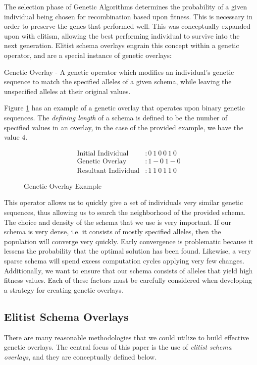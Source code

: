 The selection phase of Genetic Algorithms determines the probability of a given individual being chosen for recombination based upon fitness. This is necessary in order to preserve the genes that performed well. This was conceptually expanded upon with elitism, allowing the best performing individual to survive into the next generation. Elitist schema overlays engrain this concept within a genetic operator, and are a special instance of genetic overlays:

\begin{overlay}
Genetic Overlay - A genetic operator which modifies an individual's genetic sequence to match the specified alleles of a given schema, while leaving the unspecified alleles at their original values. 
\end{overlay}

Figure \ref{GO-Fig} has an example of a genetic overlay that operates upon binary genetic sequences. The \emph{defining length} of a schema is defined to be the number of specified values in an overlay, in the case of the provided example, we have the value $4$.

\begin{figure}[h!]
\centering 
\begin{align*}
\text{Initial Individual} &: 0~1~0~0~1~0 		\\
\text{Genetic Overlay} &: 1-0~1-0				\\
\text{Resultant Individual} &: 1~1~0~1~1~0			
\end{align*}

\caption{Genetic Overlay Example}
\label{GO-Fig}
\end{figure}


This operator allows us to quickly give a set of individuals very similar genetic sequences, thus allowing us to search the neighborhood of the provided schema. The choice and density of the schema that we use is very important. If our schema is very dense, i.e. it consists of mostly specified alleles, then the population will converge very quickly. Early convergence is problematic because it lessens the probability that the optimal solution has been found\cite{Deb99}. Likewise, a very sparse schema will spend excess computation cycles applying very few changes. Additionally, we want to ensure that our schema consists of alleles that yield high fitness values. Each of these factors must be carefully considered when developing a strategy for creating genetic overlays. 

\subsection*{Elitist Schema Overlays}
There are many reasonable methodologies that we could utilize to build effective genetic overlays. The central focus of this paper is the use of \emph{elitist schema overlays}, and they are conceptually defined below.

